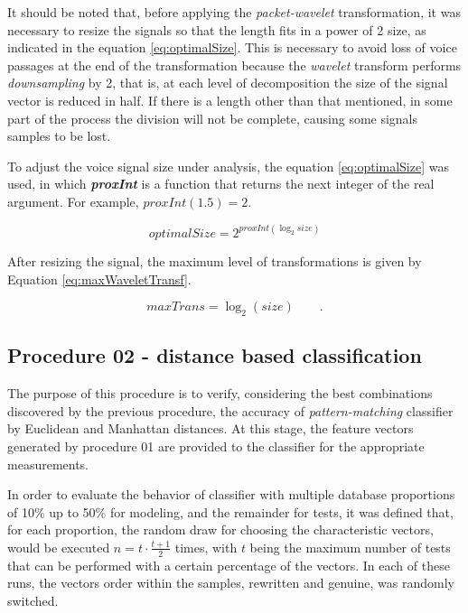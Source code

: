 			\par It should be noted that, before applying the \textit{packet-wavelet} transformation, it was necessary to resize the signals so that the length fits in a power of 2 size, as indicated in the equation \ref{eq:optimalSize}. This is necessary to avoid loss of voice passages at the end of the transformation because the \textit{wavelet} transform performs \textit{downsampling} by 2, that is, at each level of decomposition the size of the signal vector is reduced in half. If there is a length other than that mentioned, in some part of the process the division will not be complete, causing some signals samples to be lost.
			
			\par To adjust the voice signal size under analysis, the equation \ref{eq:optimalSize} was used, in which \textit{\textbf{proxInt}} is a function that returns the next integer of the real argument. For example, $proxInt(1.5)=2$.

			\begin{equation}
				optimalSize=2^{proxInt(\log_{2}size)}
				\label{eq:optimalSize}
			\end{equation} 
			
			\par After resizing the signal, the maximum level of transformations is given by Equation \ref{eq:maxWaveletTransf}. 
			
			\begin{equation}
				maxTrans=\log_{2}(size) \qquad.
				\label{eq:maxWaveletTransf}
			\end{equation}
			
			\subsection{Procedure 02 - distance based classification}
			\label{chap:propApproach:sec:Experimento02}
			\par The purpose of this procedure is to verify, considering the best combinations discovered by the previous procedure, the accuracy of \textit{pattern-matching} classifier by Euclidean and Manhattan distances. At this stage, the feature vectors generated by procedure 01 are provided to the classifier for the appropriate measurements.
			
			\par In order to evaluate the behavior of classifier with multiple database proportions of 10\% up to 50\% for modeling, and the remainder for tests, it was defined that, for each proportion, the random draw for choosing the characteristic vectors, would be executed $n=t\cdot\frac{t+1}{2}$ times, with $t$ being the maximum number of tests that can be performed with a certain percentage of the vectors. In each of these runs, the vectors order within the samples, rewritten and genuine, was randomly switched.
			
